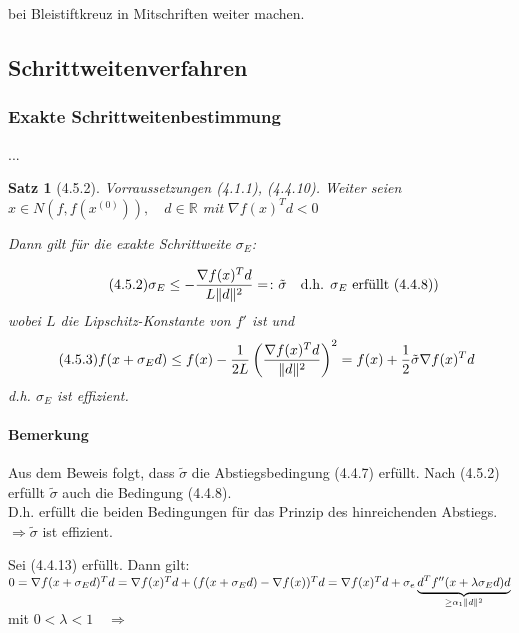 \documentclass[ngerman,halfparskip]{scrartcl}
\DeclarePairedDelimiter{\norm}{\lVert}{\rVert}
\newtheorem*{satz}{Satz}
\theoremstyle{definition}
\newcommand*{\R}{\mathbb{R}}      %
\begin{document}
bei Bleistiftkreuz in Mitschriften weiter machen.



















\subsection{Schrittweitenverfahren}
\subsubsection{Exakte Schrittweitenbestimmung}
...



\begin{satz}[4.5.2]
Vorraussetzungen (4.1.1), (4.4.10). Weiter seien $x\in N(f,f(x^{(0)})), \quad d\in \R$ mit $\nabla f(x)^Td<0$

Dann gilt für die exakte Schrittweite $\sigma_E$:

\begin{gather*}\tag{4.5.2}
\sigma_E \leq -\frac{\nabla f(x)^Td}{L\norm{d}^2}=\colon \tilde \sigma \quad \text{d.h. $\sigma_E$ erfüllt (4.4.8))}
\end{gather*}
wobei $L$ die Lipschitz-Konstante von $f'$ ist und
\begin{gather*}\tag{4.5.3}
f(x+\sigma_E d)\leq f(x)-\frac{1}{2L}\left(\frac{\nabla f(x)^Td}{\norm{d}^2} \right)^2=f(x)+\frac 12\tilde \sigma \nabla f(x)^Td \quad 
\end{gather*}
d.h. $\sigma_E$ ist effizient.
\end{satz}

\paragraph{Bemerkung} Aus dem Beweis folgt, dass $\tilde \sigma$ die Abstiegsbedingung (4.4.7) erfüllt. Nach (4.5.2) erfüllt $\tilde \sigma$ auch die Bedingung (4.4.8).\\
D.h. erfüllt die beiden Bedingungen für das Prinzip des hinreichenden Abstiegs. \\
$\Rightarrow \tilde \sigma$ ist effizient.

Sei (4.4.13) erfüllt. Dann gilt:
$0=\nabla f(x+\sigma_Ed)^Td=\nabla f(x)^Td + (f(x+\sigma_Ed)-\nabla f(x))^Td=\nabla f(x)^Td+\sigma_e\underbrace{d^Tf''(x+\lambda\sigma_Ed)d}_{\geq \alpha_1\norm{d}^2}$ mit $0<\lambda<1\quad \Rightarrow$
\end{document}
